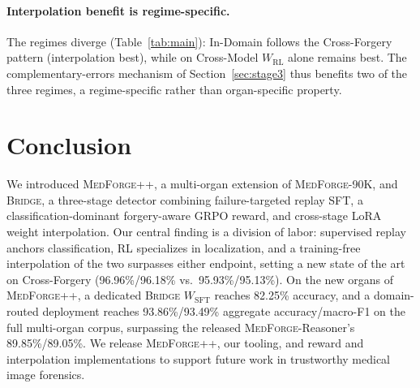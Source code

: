 \documentclass[10pt,twocolumn,letterpaper]{article}
\newcommand{\bridge}{\textsc{Bridge}}
\newcommand{\medforge}{\textsc{MedForge}}
\newcommand{\medforgepp}{\textsc{MedForge++}}
\begin{document}
\paragraph{Interpolation benefit is regime-specific.} The regimes diverge (Table~\ref{tab:main}): In-Domain follows the Cross-Forgery pattern (interpolation best), while on Cross-Model $W_{\mathrm{RL}}$ alone remains best. The complementary-errors mechanism of Section~\ref{sec:stage3} thus benefits two of the three regimes, a regime-specific rather than organ-specific property.

\section{Conclusion}
\label{sec:conclusion}
We introduced \medforgepp{}, a multi-organ extension of \medforge{}-90K, and \bridge{}, a three-stage detector combining failure-targeted replay SFT, a classification-dominant forgery-aware GRPO reward, and cross-stage LoRA weight interpolation. Our central finding is a division of labor: supervised replay anchors classification, RL specializes in localization, and a training-free interpolation of the two surpasses either endpoint, setting a new state of the art on Cross-Forgery (96.96\%/96.18\% vs.\ 95.93\%/95.13\%). On the new organs of \medforgepp{}, a dedicated \bridge{} $W_{\mathrm{SFT}}$ reaches 82.25\% accuracy, and a domain-routed deployment reaches 93.86\%/93.49\% aggregate accuracy/macro-F1 on the full multi-organ corpus, surpassing the released \medforge{}-Reasoner's 89.85\%/89.05\%. We release \medforgepp{}, our tooling, and reward and interpolation implementations to support future work in trustworthy medical image forensics.

{
    \small
    
    
}
\end{document}
